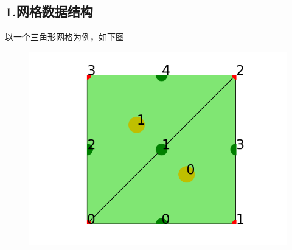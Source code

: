\documentclass{article}
\begin{document}
\subsection{1.网格数据结构}
以一个三角形网格为例，如下图
\begin{figure}[H]
\centering
\includegraphics[scale=0.5]{./figures/picture_2.png}
\caption{}
\end{figure}
\end{document}
